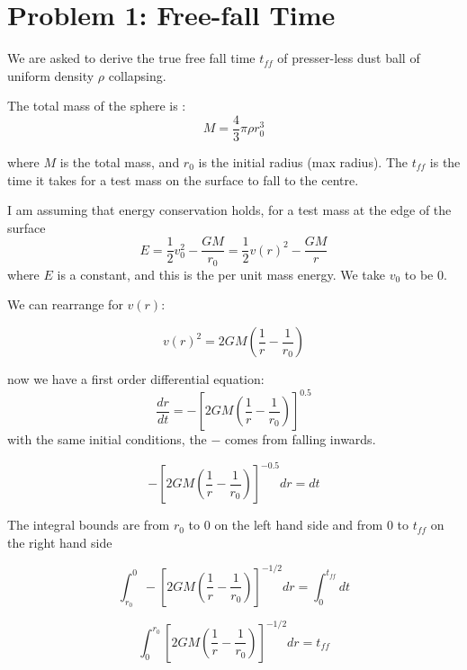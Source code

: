 

\section*{Problem 1: Free-fall Time}


We are asked to derive the true free fall time $t_{ff}$ of presser-less dust ball of uniform density $\rho$ collapsing.

The total mass of the sphere is :
\begin{equation} \label{eq:mass_enclosed}
    M = \frac{4}{3}\pi \rho r_0^3
\end{equation}

where $M$ is the total mass, and $r_0$ is the initial radius (max radius). The  $t_{ff}$ is the time it takes for a test mass on the surface to fall to the centre. 

I am assuming that energy conservation holds, for a test mass at the edge of the surface
\begin{equation}
    E = \frac{1}{2}v_0^2 - \frac{GM}{r_0} = \frac{1}{2}v(r)^2 - \frac{GM}{r} 
\end{equation}
where $E$ is a constant, and this is the per unit mass energy. We take $v_0$ to be 0. 

We can rearrange for $v(r)$:

\begin{equation}
    v(r)^2 = 2GM(\frac{1}{r} - \frac{1}{r_0}) 
\end{equation}

now we have a first order differential equation: 
\begin{equation}
    \frac{dr}{dt} = -[2GM(\frac{1}{r} - \frac{1}{r_0})]^{0.5}
\end{equation}
with the same initial conditions, the $-$ comes from falling inwards. 

\begin{equation}
     -[2GM(\frac{1}{r} - \frac{1}{r_0})]^{-0.5} dr = dt
\end{equation}

The integral bounds are from $r_0$ to $0$ on the left hand side and from $ 0$ to $t_{ff}$ on the right hand side

\begin{equation}
    \int_{r_0}^{0} 
    -\left[2GM\!\left(\frac{1}{r}-\frac{1}{r_0}\right)\right]^{-1/2} dr 
    = \int_{0}^{t_{ff}} dt
\end{equation}

\begin{equation}
    \int_{0}^{r_0} 
    \left[2GM\!\left(\frac{1}{r}-\frac{1}{r_0}\right)\right]^{-1/2} dr 
    = t_{ff}
\end{equation}

